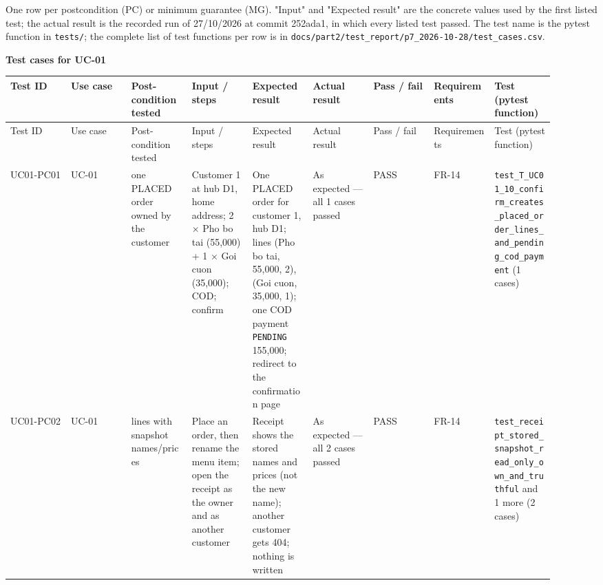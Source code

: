 One row per postcondition (PC) or minimum guarantee (MG). "Input" and "Expected result" are the concrete values used by the first listed test; the actual result is the recorded run of 27/10/2026 at commit 252ada1, in which every listed test passed. The test name is the pytest function in \texttt{tests/\allowbreak{}}; the complete list of test functions per row is in \texttt{docs/\allowbreak{}part2/\allowbreak{}test\_\allowbreak{}report/\allowbreak{}p7\_\allowbreak{}2026-10-28/\allowbreak{}test\_\allowbreak{}cases.\allowbreak{}csv}.

\textbf{Test cases for UC-01}

\begin{landscape}
\begingroup\footnotesize
\begin{longtable}{>{\raggedright\arraybackslash}p{0.1022\linewidth}>{\raggedright\arraybackslash}p{0.1022\linewidth}>{\raggedright\arraybackslash}p{0.1022\linewidth}>{\raggedright\arraybackslash}p{0.1022\linewidth}>{\raggedright\arraybackslash}p{0.1022\linewidth}>{\raggedright\arraybackslash}p{0.1022\linewidth}>{\raggedright\arraybackslash}p{0.1022\linewidth}>{\raggedright\arraybackslash}p{0.1022\linewidth}>{\raggedright\arraybackslash}p{0.1022\linewidth}}
Test ID & Use case & Post-condition tested & Input / steps & Expected result & Actual result & Pass / fail & Requirements & Test (pytest function) \\
\hline\endfirsthead
Test ID & Use case & Post-condition tested & Input / steps & Expected result & Actual result & Pass / fail & Requirements & Test (pytest function) \\
\hline\endhead
UC01-PC01 & UC-01 & one PLACED order owned by the customer & Customer 1 at hub D1, home address; 2 \ensuremath{\times} Pho bo tai (55,000) + 1 \ensuremath{\times} Goi cuon (35,000); COD; confirm & One PLACED order for customer 1, hub D1; lines (Pho bo tai, 55,000, 2), (Goi cuon, 35,000, 1); one COD payment \texttt{PENDING} 155,000; redirect to the confirmation page & As expected --- all 1 cases passed & PASS & FR-14 & \texttt{test\_\allowbreak{}T\_\allowbreak{}UC01\_\allowbreak{}10\_\allowbreak{}confirm\_\allowbreak{}creates\_\allowbreak{}placed\_\allowbreak{}order\_\allowbreak{}lines\_\allowbreak{}and\_\allowbreak{}pending\_\allowbreak{}cod\_\allowbreak{}payment} (1 cases) \\
UC01-PC02 & UC-01 & lines with snapshot names/prices & Place an order, then rename the menu item; open the receipt as the owner and as another customer & Receipt shows the stored names and prices (not the new name); another customer gets 404; nothing is written & As expected --- all 2 cases passed & PASS & FR-14 & \texttt{test\_\allowbreak{}receipt\_\allowbreak{}stored\_\allowbreak{}snapshot\_\allowbreak{}read\_\allowbreak{}only\_\allowbreak{}own\_\allowbreak{}and\_\allowbreak{}truthful} and 1 more (2 cases) \\

\end{longtable}
\end{landscape}
